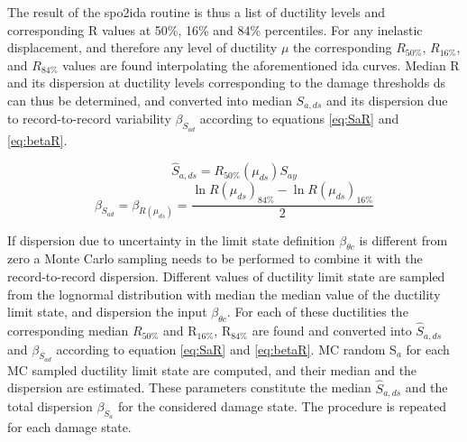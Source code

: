 The result of the spo2ida routine is thus a list of ductility levels and corresponding R values at 50\%, 16\% and 84\% percentiles. For any inelastic displacement, and therefore any level of ductility $\mu$ the corresponding $R_{50\%}$, $R_{16\%}$, and $R_{84\%}$ values are found interpolating the aforementioned ida curves.
Median R and its dispersion at ductility levels corresponding to the damage thresholds ds can thus be determined, and converted into median $S_{a, ds}$ and its dispersion due to record-to-record variability $\beta_{S_{a d}}$ according to equations \ref{eq:SaR} and \ref{eq:betaR}. 

\begin{equation}
\hat{S}_{a, ds} = R_{50\%}(\mu_{ds}) S_{ay}
\label{eq:SaR}
\end{equation}
\begin{equation}
\beta_{S_{a d}} = \beta_{R(\mu_{ds})} = \frac{\ln R(\mu_{ds})_{84\%} - \ln R(\mu_{ds})_{16\%}}{2}
\label{eq:betaR}
\end{equation} 

If dispersion due to uncertainty in the limit state definition $\beta_{\theta c}$ is different from zero a Monte Carlo sampling needs to be performed to combine it with the record-to-record dispersion. Different values of ductility limit state are sampled from the  lognormal distribution with median the median value of the ductility limit state, and dispersion the input $\beta_{\theta c}$. For each of these ductilities the corresponding median $R_{50\%}$ and R$_{16\%}$, R$_{84\%}$ are found and converted into $\hat{S}_{a,ds}$ and $\beta_S_{a d}$ according to equation \ref{eq:SaR} and \ref{eq:betaR}. MC random S$_a$ for each MC sampled ductility limit state are computed, and their median and the dispersion are estimated. These parameters constitute the median $\hat{S}_{a,ds}$ and the total dispersion $\beta_{S_a}$ for the considered damage state. The procedure is repeated for each damage state.

